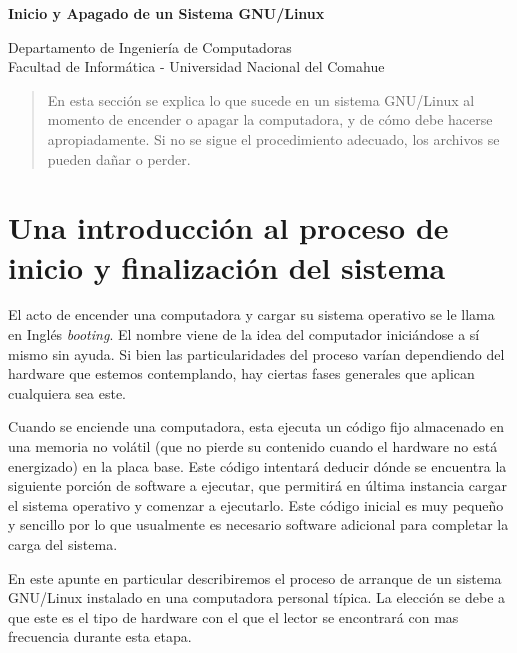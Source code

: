 \documentclass[12pt]{article}
\def\maketitle{

 \makeatletter
 {\color{bl} \centering \huge \sc \textbf{
Inicio y Apagado de un Sistema GNU/Linux \\ 
 \vspace*{8pt} }\par}
 \makeatother


 \makeatletter
 {\centering \small 
 	Departamento de Ingeniería de Computadoras \\
 	Facultad de Informática - Universidad Nacional del Comahue \\
 	\vspace{20pt} }
 \makeatother

}
\begin{document}
\thispagestyle{empty}
\maketitle
\setlength{\parindent}{0pt}


\begin{abstract}
 En esta sección se explica lo que sucede en un sistema GNU/Linux al momento
de encender o apagar la computadora, y de cómo debe hacerse apropiadamente. Si
no se sigue el procedimiento adecuado, los archivos se pueden dañar o perder.
\end{abstract}



\section{Una introducción al proceso de inicio y finalización del sistema}

El acto de  encender una computadora y cargar su sistema operativo 
se le llama en Inglés \textit{booting}. El nombre viene de
la idea del computador iniciándose a sí mismo sin ayuda. Si bien las particularidades
del proceso varían dependiendo del hardware que estemos contemplando, hay ciertas
fases generales que aplican cualquiera sea este. 

Cuando se enciende una computadora, esta ejecuta un código fijo almacenado en una 
memoria no volátil (que no pierde su contenido cuando el hardware no está energizado) en la 
placa base. Este código intentará deducir dónde se encuentra
la siguiente porción de software a ejecutar, que permitirá en última instancia 
cargar el sistema operativo y comenzar a ejecutarlo. Este código inicial es muy pequeño 
y sencillo por lo 
que usualmente es necesario software adicional para completar la carga del sistema. 

En este apunte en particular describiremos el proceso de arranque de un sistema 
GNU/Linux instalado en una computadora personal típica. La elección se debe a que 
este es el tipo de hardware con el que el lector se encontrará con mas frecuencia 
durante esta etapa.  
\end{document}
